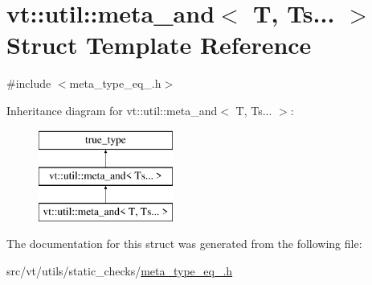 \hypertarget{structvt_1_1util_1_1meta__and_3_01_t_00_01_ts_8_8_8_01_4}{}\section{vt\+:\+:util\+:\+:meta\+\_\+and$<$ T, Ts... $>$ Struct Template Reference}
\label{structvt_1_1util_1_1meta__and_3_01_t_00_01_ts_8_8_8_01_4}


{\ttfamily \#include $<$meta\+\_\+type\+\_\+eq\+\_\+.\+h$>$}

Inheritance diagram for vt\+:\+:util\+:\+:meta\+\_\+and$<$ T, Ts... $>$\+:\begin{figure}[H]
\begin{center}
\leavevmode
\includegraphics[height=3.000000cm]{structvt_1_1util_1_1meta__and_3_01_t_00_01_ts_8_8_8_01_4}
\end{center}
\end{figure}


The documentation for this struct was generated from the following file\+:\begin{DoxyCompactItemize}
\item 
src/vt/utils/static\+\_\+checks/\hyperlink{meta__type__eq___8h}{meta\+\_\+type\+\_\+eq\+\_\+.\+h}\end{DoxyCompactItemize}
